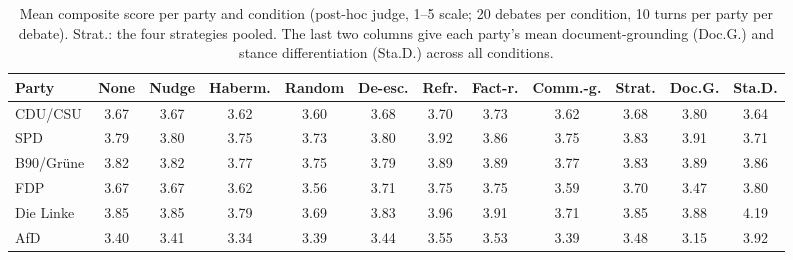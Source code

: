 \begin{table}[htb]
\centering
\caption[Judge scores by party and condition]{Mean composite score per party and condition (post-hoc judge, 1--5 scale; 20 debates per condition, 10 turns per party per debate). Strat.: the four strategies pooled. The last two columns give each party's mean document-grounding (Doc.G.) and stance differentiation (Sta.D.) across all conditions.}
\label{tab:party-condition}
\scriptsize
\setlength{\tabcolsep}{3pt}
\begin{tabular}{l ccccccccc cc}
\toprule
\textbf{Party} & None & Nudge & Haberm. & Random & De-esc. & Refr. & Fact-r. & Comm.-g. & Strat. & Doc.G. & Sta.D. \\
\midrule
CDU/CSU & 3.67 & 3.67 & 3.62 & 3.60 & 3.68 & 3.70 & 3.73 & 3.62 & 3.68 & 3.80 & 3.64 \\
SPD & 3.79 & 3.80 & 3.75 & 3.73 & 3.80 & 3.92 & 3.86 & 3.75 & 3.83 & 3.91 & 3.71 \\
B90/Gr\"{u}ne & 3.82 & 3.82 & 3.77 & 3.75 & 3.79 & 3.89 & 3.89 & 3.77 & 3.83 & 3.89 & 3.86 \\
FDP & 3.67 & 3.67 & 3.62 & 3.56 & 3.71 & 3.75 & 3.75 & 3.59 & 3.70 & 3.47 & 3.80 \\
Die Linke & 3.85 & 3.85 & 3.79 & 3.69 & 3.83 & 3.96 & 3.91 & 3.71 & 3.85 & 3.88 & 4.19 \\
AfD & 3.40 & 3.41 & 3.34 & 3.39 & 3.44 & 3.55 & 3.53 & 3.39 & 3.48 & 3.15 & 3.92 \\
\bottomrule
\end{tabular}
\end{table}
